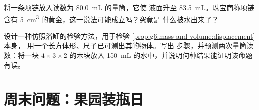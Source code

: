 \begin{exercise}[$\star\star$]\label{exo:g6:mass-and-volume:11}
将一条项链放入读数为 \qty{80.0}{mL} 的量筒，它使
液面升至 \qty{83.5}{mL}。珠宝商称项链含有
\qty{5}{cm^3} 的黄金，这一说法可能成立吗？究竟是
什么被水出来了？
\end{exercise}

\begin{exercise}[$\star\star\star$]\label{exo:g6:mass-and-volume:12}
设计一种仿照浴缸的检验方法，用于检验
\cref{prop:g6:mass-and-volume:displacement} 本身，
用一个长方体形、尺子已可测出其的物体。写出
步骤，并预测两次量筒读数：将一块
$4 \times 3 \times 2$ 的木块放入
\qty{150}{mL} 的水中，并说明何种结果能证明该命题
有误。
\end{exercise}

\section{周末问题：果园装瓶日}

